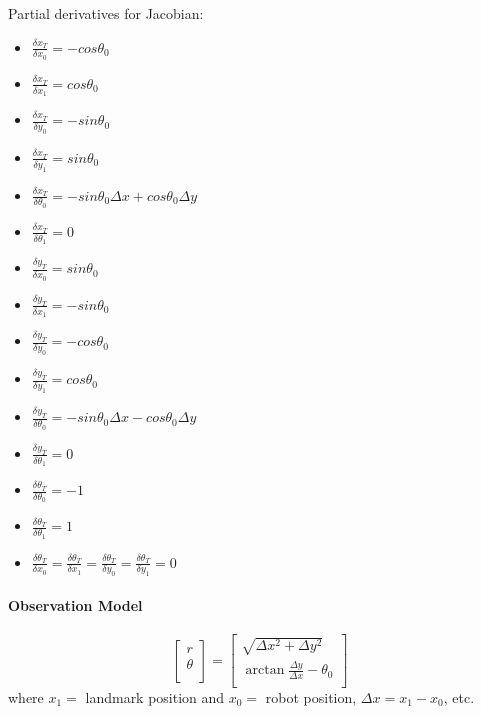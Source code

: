 \documentclass[12pt]{article}
\begin{document}
Partial derivatives for Jacobian:
\begin{multicols}{2}
\begin{itemize}
	\item $\frac{\delta x_T}{\delta x_0} = -cos\theta_0$
	\item $\frac{\delta x_T}{\delta x_1} = cos\theta_0$
	\item $\frac{\delta x_T}{\delta y_0} = -sin\theta_0$
	\item $\frac{\delta x_T}{\delta y_1} = sin\theta_0$
	\item $\frac{\delta x_T}{\delta \theta_0} = -sin\theta_0\Delta x + cos\theta_0\Delta y$
	\item $\frac{\delta x_T}{\delta \theta_1} = 0$
	\item $\frac{\delta y_T}{\delta x_0} = sin\theta_0$
	\item $\frac{\delta y_T}{\delta x_1} = -sin\theta_0$
	\item $\frac{\delta y_T}{\delta y_0} = -cos\theta_0$
	\item $\frac{\delta y_T}{\delta y_1} = cos\theta_0$
	\item $\frac{\delta y_T}{\delta \theta_0} = -sin\theta_0\Delta x - cos\theta_0\Delta y$
	\item $\frac{\delta y_T}{\delta \theta_1} = 0$
	\item $\frac{\delta \theta_T}{\delta \theta_0} = -1$
	\item $\frac{\delta \theta_T}{\delta \theta_1} = 1$
	\item $\frac{\delta \theta_T}{\delta x_0} = \frac{\delta \theta_T}{\delta x_1} = \frac{\delta \theta_T}{\delta y_0} = \frac{\delta \theta_T}{\delta y_1} = 0$
\end{itemize}
\end{multicols}

\paragraph{Observation Model}
\[ \left[ \begin{array}{c}
r \\
\theta \\
\end{array} \right] =
\left[ \begin{array}{c}
\sqrt{\Delta x^2 + \Delta y^2} \\
\arctan \frac{\Delta y}{\Delta x} - \theta_0 \\
\end{array} \right]
\]
where $x_1 = $ landmark position and $x_0 = $ robot position, $\Delta x = x_1 - x_0$, etc.\\
\end{document}
